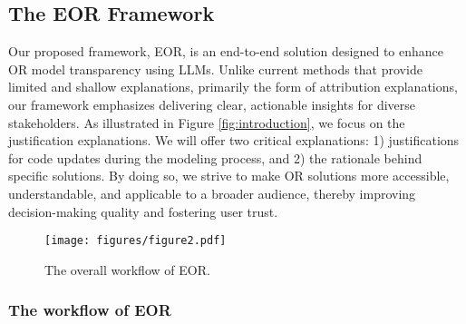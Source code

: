 \subsection{The EOR Framework}
Our proposed framework, EOR, is an end-to-end solution designed to enhance OR model transparency using LLMs. Unlike current methods that provide limited and shallow explanations, primarily the form of attribution explanations, our framework emphasizes delivering clear, actionable insights for diverse stakeholders. As illustrated in Figure \ref{fig:introduction}, we focus on the justification explanations. We will offer two critical explanations: 1) justifications for code updates during the modeling process, and 2) the rationale behind specific solutions. By doing so, we strive to make OR solutions more accessible, understandable, and applicable to a broader audience, thereby improving decision-making quality and fostering user trust.

\begin{figure}[ht]
\begin{center}
\texttt{[image: figures/figure2.pdf]}
\end{center}
\caption{The overall workflow of EOR.}
\label{fig:framework}
\vspace{-10pt}
\end{figure}

\subsubsection{The workflow of EOR}

